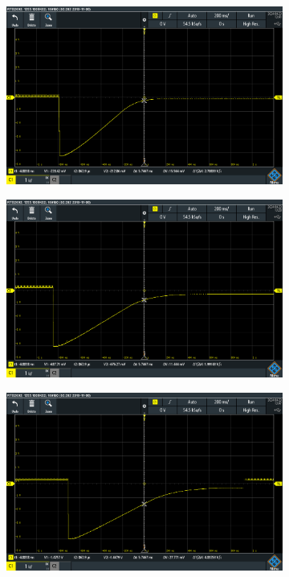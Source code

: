 \begin{figure}
	\centering
	\begin{subfigure}{0.48\columnwidth}
		\centering
		\includegraphics[width=0.8\linewidth]{src/figures/oscilloscope-raw/p60-d0.png}
		\label{fig:oscilloscope-raw-p60-d0}
	\end{subfigure}
	\begin{subfigure}{0.48\columnwidth}
		\centering
		\includegraphics[width=0.8\linewidth]{src/figures/oscilloscope-raw/p60-d60.png}
		\label{fig:oscilloscope-raw-p60-d60}
	\end{subfigure}
	\begin{subfigure}{0.48\columnwidth}
		\centering
		\includegraphics[width=0.8\linewidth]{src/figures/oscilloscope-raw/p60-d80.png}

\end{subfigure}
\end{figure}
